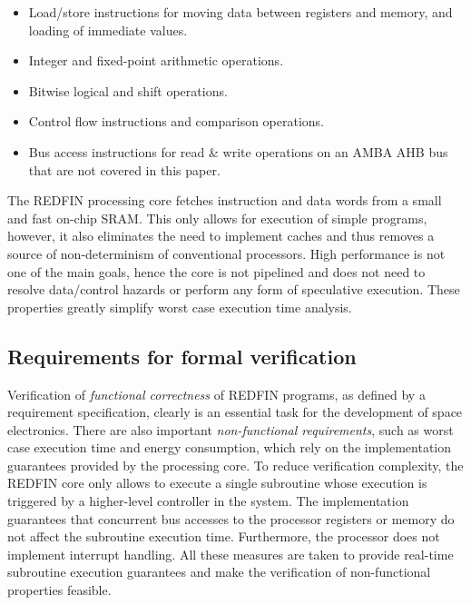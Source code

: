 \vspace{-0.5mm}
\begin{itemize}
\item{Load/store instructions for moving data between registers and memory, and
loading of immediate values.}
\item{Integer and fixed-point arithmetic operations.}
\item{Bitwise logical and shift operations.}
\item{Control flow instructions and comparison operations.}
\item{Bus access instructions for read \& write operations on an AMBA AHB bus
that are not covered in this paper.}
\end{itemize}
\vspace{-0.5mm}

The REDFIN processing core fetches instruction and data words from a small and fast
on-chip SRAM. This only allows for execution of simple programs, however, it also
eliminates the need to implement caches and thus removes a source of non-determinism of
conventional processors. High performance is not one of the main goals, hence the
core is not pipelined and does not need to resolve data/control hazards or
perform any form of speculative execution. These properties greatly simplify
worst case execution time analysis.

\vspace{-1.2mm}
\subsection{Requirements for formal verification}
\vspace{-0.5mm}

Verification of \emph{functional correctness} of REDFIN programs, as defined by a
requirement specification, clearly is an essential task for the development of space
electronics. There are also important \emph{non-functional requirements}, such as
worst case execution time and energy consumption, which rely on the implementation
guarantees provided by the processing core. To reduce verification complexity,
the REDFIN core only allows to execute a single subroutine whose execution is triggered
by a higher-level controller in the system. The implementation guarantees that
concurrent bus accesses to the processor registers or memory do not affect
the subroutine execution time. Furthermore, the processor does not implement
interrupt handling. All these measures are taken to provide real-time
subroutine execution guarantees and make the verification of non-functional
properties feasible. %

